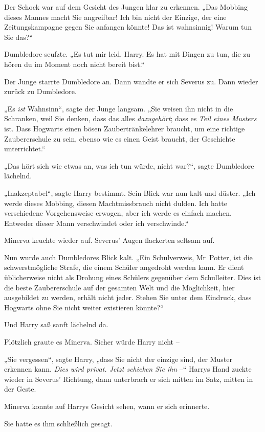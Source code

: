 {Der Schock war auf dem Gesicht des Jungen klar zu erkennen. „Das Mobbing dieses Mannes macht Sie angreifbar! Ich bin nicht der Einzige, der eine Zeitungskampagne gegen Sie anfangen könnte! Das ist wahnsinnig! Warum tun Sie das?“

Dumbledore seufzte. „Es tut mir leid, Harry. Es hat mit Dingen zu tun, die zu hören du im Moment noch nicht bereit bist.“

Der Junge starrte Dumbledore an. Dann wandte er sich Severus zu. Dann wieder zurück zu Dumbledore.

„Es \emph{ist} Wahnsinn“, sagte der Junge langsam. „Sie weisen ihn nicht in die Schranken, weil Sie denken, dass das alles \emph{dazugehört}; dass es \emph{Teil eines Musters} ist. Dass Hogwarts einen bösen Zaubertränkelehrer braucht, um eine richtige Zaubererschule zu sein, ebenso wie es einen Geist braucht, der Geschichte unterrichtet.“

„Das hört sich wie etwas an, was ich tun würde, nicht war?“, sagte Dumbledore lächelnd.

„Inakzeptabel“, sagte Harry bestimmt. Sein Blick war nun kalt und düster. „Ich werde dieses Mobbing, diesen Machtmissbrauch nicht dulden. Ich hatte verschiedene Vorgehensweise erwogen, aber ich werde es einfach machen. Entweder dieser Mann verschwindet oder ich verschwinde.“

Minerva keuchte wieder auf. Severus' Augen flackerten seltsam auf.

Nun wurde auch Dumbledores Blick kalt. „Ein Schulverweis, Mr~Potter, ist die schwerstmögliche Strafe, die einem Schüler angedroht werden kann. Er dient üblicherweise nicht als Drohung eines Schülers gegenüber dem Schulleiter. Dies ist die beste Zaubererschule auf der gesamten Welt und die Möglichkeit, hier ausgebildet zu werden, erhält nicht jeder. Stehen Sie unter dem Eindruck, dass Hogwarts ohne Sie nicht weiter existieren könnte?“

Und Harry saß sanft lächelnd da.

Plötzlich graute es Minerva. Sicher würde Harry nicht --

„Sie vergessen“, sagte Harry, „dass Sie nicht der einzige sind, der Muster erkennen kann. \emph{Dies wird privat. Jetzt schicken Sie ihn} --“ Harrys Hand zuckte wieder in Severus' Richtung, dann unterbrach er sich mitten im Satz, mitten in der Geste.

Minerva konnte auf Harrys Gesicht sehen, wann er sich erinnerte.

Sie hatte es ihm schließlich gesagt.

}
